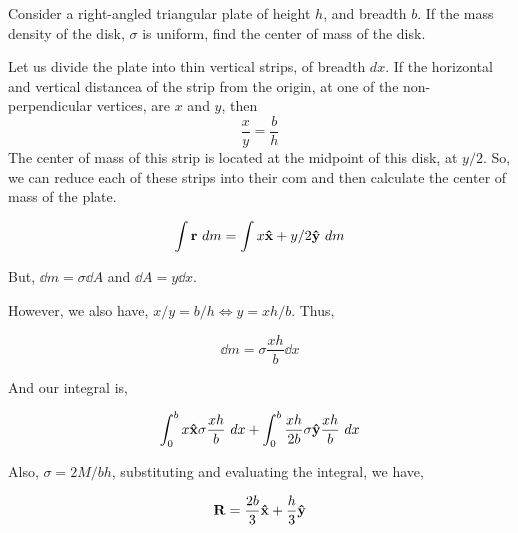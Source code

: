 \begin{example}
    Consider a right-angled triangular plate of height \(h\), and breadth \(b\). If the mass density 
    of the disk, \(\sigma\) is uniform, find the center of mass of the disk.


    \begin{soln}
        Let us divide the plate into thin vertical strips, of breadth \(dx\). If the horizontal and vertical distancea of 
        the strip from the origin, at one of the non-perpendicular vertices, are \(x\) and \(y\), then
        \begin{equation*}
            \frac{x}{y} = \frac{b}{h}
        \end{equation*} 
        The center of mass of this strip is located at the midpoint of this disk, at \(y/2\).
        So, we can reduce each of these strips into their com and then calculate the center of mass of the plate.

        \begin{equation*}
            \int \boldsymbol{\mathbf{r}} \mathop{}{d}{m} = \int x \boldsymbol{\mathbf{\hat{x}}} + y/2 \boldsymbol{\mathbf{\hat{y}}} \mathop{}{d}{m}
        \end{equation*}

        But, \(\dd{m} = \sigma \dd{A}\) and \(\dd{A} = y \dd{x}\). 

        However, we also have, \(x/y = b/h \iff y = xh/b\). Thus, 

        \begin{equation*}
            \dd{m} = \sigma \frac{xh}{b} \dd{x}
        \end{equation*}

        And our integral is,

        \begin{equation*}
            \int_{0}^{b} x \boldsymbol{\mathbf{\hat{x}}} \sigma \frac{xh}{b} \mathop{}{d}{x}+ \int_{0}^b \frac{xh}{2b} \sigma \boldsymbol{\mathbf{\hat{y}}} \frac{xh}{b} \mathop{}{d}{x}
        \end{equation*}

        Also, \(\sigma = 2M/bh\), substituting and evaluating the integral, we have,

        \begin{equation}
            \boldsymbol{\mathbf{R}} = \frac{2b}{3} \boldsymbol{\mathbf{\hat{x}}} + \frac{h}{3} \boldsymbol{\mathbf{\hat{y}}}
        \end{equation}

    \end{soln}
\end{example}
